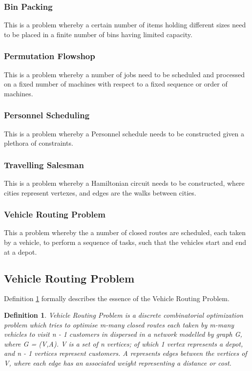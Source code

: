 \documentclass[a4paper,12pt]{article}
\newtheorem{definition}{Definition}[section]
\begin{document}
        \subsubsection{Bin Packing}
            \par{
            This is a problem whereby a certain number of items holding different sizes need to be placed in a finite number of bins having limited capacity.
            }
        \subsubsection{Permutation Flowshop}
            \par{
            This is a problem whereby a number of jobs need to be scheduled and processed on a fixed number of machines with respect to a fixed sequence or order of machines. 
            }
        \subsubsection{Personnel Scheduling}
            \par{
            This is a problem whereby a Personnel schedule needs to be constructed given a plethora of constraints.
            }
        \subsubsection{Travelling Salesman}
            \par{This is a problem whereby a Hamiltonian circuit needs to be constructed, where cities represent vertexes, and edges are the walks between cities.}
        \subsubsection{Vehicle Routing Problem}
            \par{This a problem whereby the a number of closed routes are scheduled, each taken by a vehicle, to perform a sequence of tasks, such that the vehicles start and end at a depot. 
            }
    \subsection{Vehicle Routing Problem}
        \par{
        Definition \ref{def:vrp} formally describes the essence of the Vehicle Routing Problem.
        \begin{definition}
            Vehicle Routing Problem is a discrete combinatorial optimization problem which tries to optimise m-many closed routes each taken by m-many vehicles to visit n - 1 customers in dispersed in a network modelled by graph G, where G = (V,A). V is a set of n vertices; of which 1 vertex represents a depot, and n - 1 vertices represent customers. A represents edges between the vertices of V, where each edge has an associated weight representing a distance or cost. 
            \label{def:vrp}
        \end{definition}
        }
\end{document}
